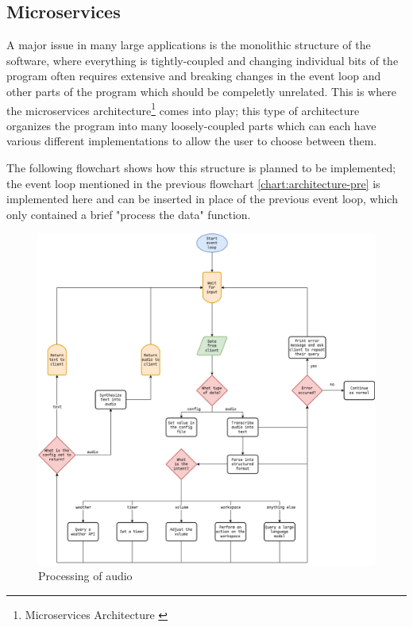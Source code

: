 \subsection{Microservices}
A major issue in many large applications is the monolithic structure of the software,
where everything is tightly-coupled and changing individual bits of the program
often requires extensive and breaking changes in the event loop and other parts of the program
which should be compeletly unrelated.
This is where the microservices architecture\footnote{Microservices Architecture \cite{microservices}}
comes into play; this type of architecture organizes the program into many loosely-coupled parts
which can each have various different implementations to allow the user to choose between them.

The following flowchart shows how this structure is planned to be implemented; the event loop mentioned in the previous flowchart \ref{chart:architecture-pre}
is implemented here and can be inserted in place of the previous event loop, which only contained a brief "process the data" function.

\begin{figure}[H]
\centering
\includegraphics[width=\textwidth]{assets/processing-pre}
\caption{Processing of audio}
\label{chart:processing-pre}
\end{figure}


